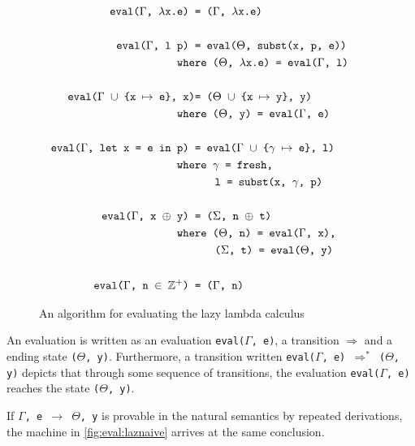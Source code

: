\begin{figure}[p]
\begin{mdframed}[style=style1]
\begin{align}
  \texttt{eval($\Gamma$, $\lambda$x.e) }&\texttt{= ($\Gamma$, $\lambda$x.e)}\tag*{}\\\tag*{}\\
  \texttt{eval($\Gamma$, l p) }&\texttt{= eval($\Theta$, subst(x, p, e))}\tag*{}\\
  \texttt{whe}&\texttt{re ($\Theta$, $\lambda$x.e) = eval($\Gamma$, l)}\tag*{}\\\tag*{}\\
  \texttt{eval($\Gamma$ $\cup$ \{x $\mapsto$ e\}, x)}&\texttt{= ($\Theta$ $\cup$ \{x $\mapsto$ y\}, y)}\tag*{}\\
  \texttt{whe}&\texttt{re ($\Theta$, y) = eval($\Gamma$, e)}\tag*{}\\\tag*{}\\
  \texttt{eval($\Gamma$, let x = e in p) }&\texttt{= eval($\Gamma$ $\cup$ \{$\gamma$ $\mapsto$ e\}, l)}\tag*{}\\
  \texttt{whe}&\texttt{re $\gamma$ = fresh,}\tag*{}\\
  &\hspace{0.62cm}\texttt{l = subst(x, $\gamma$, p)}\tag*{}\\\tag*{}\\
  \texttt{eval($\Gamma$, x $\oplus$ y) }&\texttt{= ($\Sigma$, n $\oplus$ t)}\tag*{}\\
  \texttt{whe}&\texttt{re ($\Theta$, n) = eval($\Gamma$, x),}\tag*{}\\
  &\hspace{0.62cm}\texttt{($\Sigma$, t) = eval($\Theta$, y)}\tag*{}\\\tag*{}\\
  \texttt{eval($\Gamma$, n $\in$ $\mathbb{Z^+}$) }&\texttt{= ($\Gamma$, n)}\tag*{}
\end{align}
\end{mdframed}
  \caption{An algorithm for evaluating the lazy lambda calculus}
  \label{fig:eval:laznaive}
\end{figure}
An evaluation is written as an evaluation \texttt{eval($\Gamma$, e)}, a transition $\Rightarrow$ and a ending state \texttt{($\Theta$, y)}.
Furthermore, a transition written \texttt{eval($\Gamma$, e) $\Rightarrow^*$ ($\Theta$, y)} depicts that through some sequence of transitions, the evaluation \texttt{eval($\Gamma$, e)} reaches the state \texttt{($\Theta$, y)}.
\begin{theorem}
  \label{theorem:conclusion}
  If \texttt{$\Gamma$, e $\rightarrow$ $\Theta$, y} is provable in the natural semantics by repeated derivations, the machine in \autoref{fig:eval:laznaive} arrives at the same conclusion.
\end{theorem}
